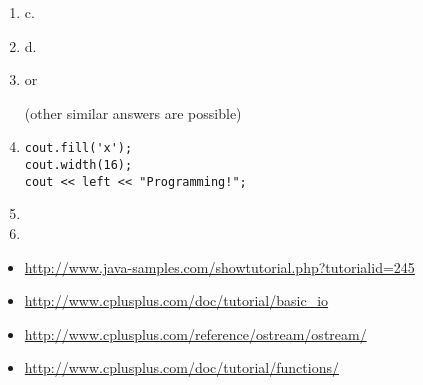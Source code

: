 \begin{enumerate}
	\item c.
	\item d.
	\item {} or
	
	
	(other similar answers are possible)
	\item
\noindent\begin{minipage}{\linewidth}\begin{lstlisting}
cout.fill('x');
cout.width(16);
cout << left << "Programming!";
\end{lstlisting}\end{minipage}
	\item {}
	\item {}
\end{enumerate}


\begin{itemize}
\item \url{http://www.java-samples.com/showtutorial.php?tutorialid=245}
\item \url{http://www.cplusplus.com/doc/tutorial/basic_io}
\item \url{http://www.cplusplus.com/reference/ostream/ostream/}
\item \url{http://www.cplusplus.com/doc/tutorial/functions/}
\end{itemize}	

